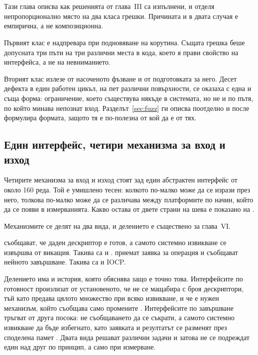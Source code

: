 \section{}

Тази глава описва как решенията от глава~III са изпълнени, и отделя непропорционално място
на два класа грешки. Причината и в двата случая е емпирична, а не композиционна.

Първият клас е надпревара при подновяване на корутина. Същата грешка беше допусната три
пъти на три различни места в кода, което я прави свойство на интерфейса, а не на
невниманието.

Вторият клас излезе от насоченото фъзване и от подготовката за него. Десет дефекта в един
работен цикъл, на пет различни повърхности, се оказаха с една и съща форма: ограничение,
което съществува някъде в системата, но не и по пътя, по който минава непознат вход.
Разделът~\ref{sec:fuzz} ги описва поотделно и после формулира формата, защото тя е
по-полезна от кой да е от тях.

\subsection{Един интерфейс, четири механизма за вход и изход}
\label{sec:iobackends}

Четирите механизма за вход и изход стоят зад един абстрактен интерфейс от около 160 реда.
Той е умишлено тесен: колкото по-малко може да се изрази през него, толкова по-малко може да
се различава между платформите по начин, който да се появи в измерванията. Какво остава от
двете страни на шева е показано на .



Механизмите се делят на два вида, и делението е съществено за глава~VI.

 съобщават, че даден дескриптор е готов, а самото системно
извикване се извършва от викащия. Такива са  и .
 приемат заявка за операция и съобщават нейното
завършване. Такива са  и IOCP.

Делението има и история, която обяснява защо е точно това. Интерфейсите по готовност
произлизат от установеното, че  не се мащабира с броя дескриптори, тъй като
предава цялото множество при всяко извикване, и че е нужен механизъм, който съобщава само
промените \cite{banga1999event}. Интерфейсите по завършване тръгват от друга посока: не
съобщаването да се съкрати, а самото системно извикване да бъде избегнато, като заявката и
резултатът се разменят през споделена памет \cite{iouring2019}. Двата вида решават различни
задачи и затова не се подреждат един над друг по принцип, а само при измерване.

